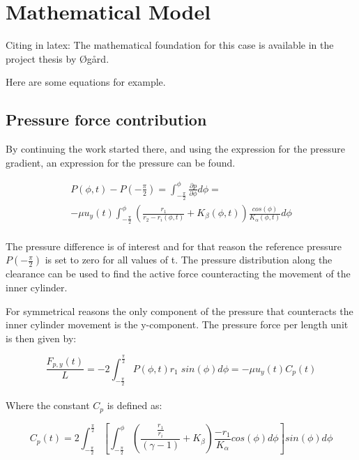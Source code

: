 \section{Mathematical Model}
	\label{sec:model}

Citing in latex: The mathematical foundation for this case is available in the project thesis by Øgård. \cite{project} 

\noindent Here are some equations for example.

\subsection{Pressure force contribution}
By continuing the work started there, and using the expression for the pressure gradient, an expression for the pressure can be found.

	\begin{multline}
		P(\phi,t) - P(-\frac{\pi}{2}) = \int_{-\frac{\pi}{2}}^{\phi} \frac{\partial p}{\partial \phi} d\phi = \\
- \mu u_y(t) \int_{-\frac{\pi}{2}}^{\phi} \left( \frac{r_1}{r_2 - r_i(\phi,t)} + K_{\beta}(\phi,t)\right)\frac{cos(\phi)}{K_{\alpha}(\phi,t)}d\phi
	\label{eq:pressure_distribution}
	\end{multline}\\

\noindent The pressure difference is of interest and for that reason the reference pressure $P(-\frac{\pi}{2})$ is set to zero for all values of t. The pressure distribution along the clearance can be used to find the active force counteracting the movement of the inner cylinder. 

For symmetrical reasons the only component of the pressure that counteracts the inner cylinder movement is the y-component. The pressure force per length unit is then given by:

	\begin{equation}
		\frac{F_{p,y}(t)}{L} = -2 \int_{-\frac{\pi}{2}}^{\frac{\pi}{2}}P(\phi,t)r_1 \; sin(\phi) d\phi = -\mu u_y(t) C_p(t)
	\label{eq:pressure_force}
	\end{equation}\\

\noindent Where the constant $C_p$ is defined as:

	\begin{equation}
		C_p(t) = 2 \int_{-\frac{\pi}{2}}^{\frac{\pi}{2}}\left[ \int_{-\frac{\pi}{2}}^{\phi} \left( \frac{\frac{r_1}{r_i}}{(\gamma-1)} + K_{\beta} \right)\frac{-r_1}{K_{\alpha}} cos(\phi) d\phi \right] sin(\phi) d\phi
	\label{eq:pressure_force_const}
	\end{equation}\\


